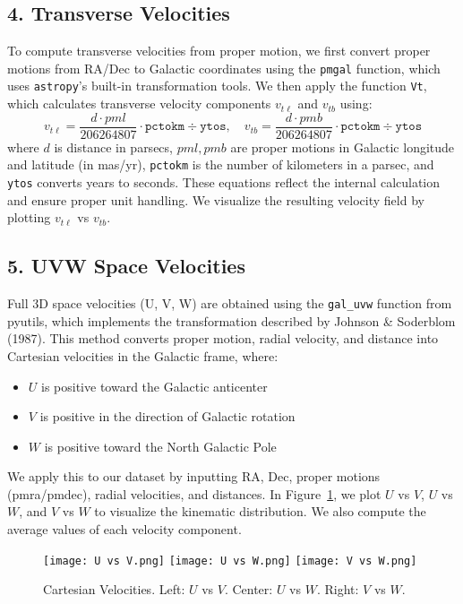 \documentclass[11pt]{article}
\begin{document}
\subsection*{4. Transverse Velocities}
To compute transverse velocities from proper motion, we first convert proper motions from RA/Dec to Galactic coordinates using the \texttt{pmgal} function, which uses \texttt{astropy}'s built-in transformation tools. We then apply the function \texttt{Vt}, which calculates transverse velocity components $v_{t\ell}$ and $v_{tb}$ using:
\begin{equation}
    v_{t\ell} = \frac{d \cdot pml}{206264807} \cdot \texttt{pctokm} \div \texttt{ytos}, \quad v_{tb} = \frac{d \cdot pmb}{206264807} \cdot \texttt{pctokm} \div \texttt{ytos}
    \label{eq:vt_internal}
\end{equation}
where $d$ is distance in parsecs, $pml, pmb$ are proper motions in Galactic longitude and latitude (in mas/yr), \texttt{pctokm} is the number of kilometers in a parsec, and \texttt{ytos} converts years to seconds. These equations reflect the internal calculation and ensure proper unit handling. We visualize the resulting velocity field by plotting $v_{t\ell}$ vs $v_{tb}$.


\subsection*{5. UVW Space Velocities}
Full 3D space velocities (U, V, W) are obtained using the \texttt{gal\_uvw} function from pyutils, which implements the transformation described by Johnson \& Soderblom (1987). This method converts proper motion, radial velocity, and distance into Cartesian velocities in the Galactic frame, where:
\begin{itemize}
  \item $U$ is positive toward the Galactic anticenter
  \item $V$ is positive in the direction of Galactic rotation
  \item $W$ is positive toward the North Galactic Pole
\end{itemize}
We apply this to our dataset by inputting RA, Dec, proper motions (pmra/pmdec), radial velocities, and distances. In Figure~\ref{fig:uvw}, we plot $U$ vs $V$, $U$ vs $W$, and $V$ vs $W$ to visualize the kinematic distribution. We also compute the average values of each velocity component.

\begin{figure}[H]
    \centering
    \texttt{[image: U vs V.png]}
    \texttt{[image: U vs W.png]}
    \texttt{[image: V vs W.png]}
    \caption{Cartesian Velocities. Left: $U$ vs $V$. Center: $U$ vs $W$. Right: $V$ vs $W$.}
    \label{fig:uvw}
\end{figure}
\end{document}
